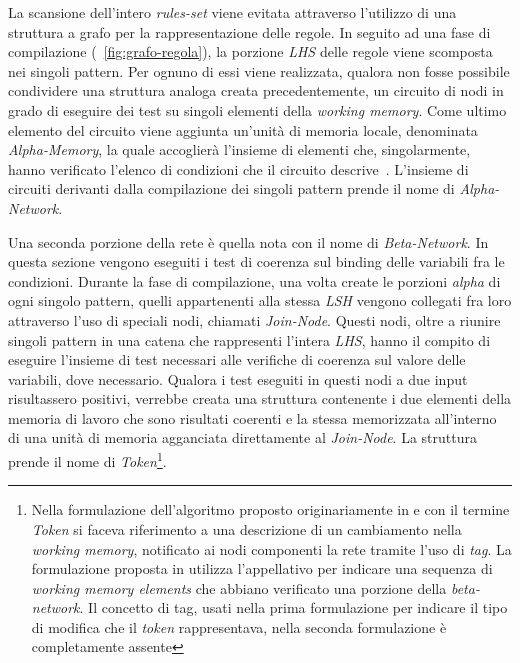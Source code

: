 La scansione dell'intero \emph{rules-set} viene evitata attraverso l'utilizzo di una struttura a grafo per la rappresentazione delle regole. In seguito ad una fase di compilazione (\figurename~\ref{fig:grafo-regola}), la porzione \emph{LHS} delle regole viene scomposta nei singoli pattern. Per ognuno di essi viene realizzata, qualora non fosse possibile condividere una struttura analoga creata precedentemente, un circuito di nodi in grado di eseguire dei test su singoli elementi della \emph{working memory}. Come ultimo elemento del circuito viene aggiunta un'unità di memoria locale, denominata \emph{Alpha-Memory}, la quale accoglierà l'insieme di elementi che, singolarmente, hanno verificato l'elenco di condizioni che il circuito descrive~\cite{Doorenbos95productionmatching}.
L'insieme di circuiti derivanti dalla compilazione dei singoli pattern prende il nome di \emph{Alpha-Network}.

Una seconda porzione della rete è quella nota con il nome di \emph{Beta-Network}. In questa sezione vengono eseguiti i test di coerenza sul binding delle variabili fra le condizioni. Durante la fase di compilazione, una volta create le porzioni \emph{alpha} di ogni singolo pattern, quelli appartenenti alla stessa \emph{LSH} vengono collegati fra loro attraverso l'uso di speciali nodi, chiamati \emph{Join-Node}. Questi nodi, oltre a riunire singoli pattern in una catena che rappresenti l'intera \emph{LHS}, hanno il compito di eseguire l'insieme di test necessari alle verifiche di coerenza sul valore delle variabili, dove necessario. Qualora i test eseguiti in questi nodi a due input risultassero positivi, verrebbe creata una struttura contenente i due elementi della memoria di lavoro che sono risultati coerenti e la stessa memorizzata all'interno di una unità di memoria agganciata direttamente al \emph{Join-Node}. 
La struttura prende il nome di \emph{Token}\footnote{Nella formulazione dell'algoritmo proposto originariamente in \cite{forgy1979} e \cite{forgy1982} con il termine \emph{Token} si faceva riferimento a una descrizione di un cambiamento nella \emph{working memory}, notificato ai nodi componenti la rete tramite l'uso di \emph{tag}. La formulazione proposta in \cite{Doorenbos95productionmatching} utilizza l'appellativo per indicare una sequenza di \emph{working memory elements} che abbiano verificato una porzione della \emph{beta-network}. Il concetto di tag, usati nella prima formulazione per indicare il tipo di modifica che il \emph{token} rappresentava, nella seconda formulazione è completamente assente}.

